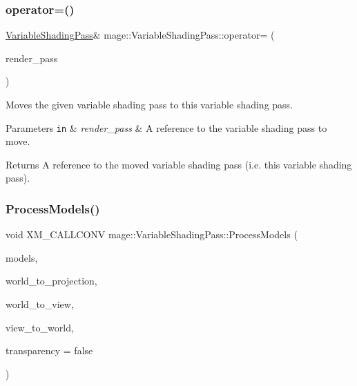 \subsubsection{\texorpdfstring{operator=()}{operator=()}\hspace{0.1cm}{\footnotesize\ttfamily [2/2]}}
{\footnotesize\ttfamily \hyperlink{classmage_1_1_variable_shading_pass}{Variable\+Shading\+Pass}\& mage\+::\+Variable\+Shading\+Pass\+::operator= (\begin{DoxyParamCaption}\item[{\hyperlink{classmage_1_1_variable_shading_pass}{Variable\+Shading\+Pass} \&\&}]{render\+\_\+pass }\end{DoxyParamCaption})\hspace{0.3cm}{\ttfamily [delete]}}

Moves the given variable shading pass to this variable shading pass.


\begin{DoxyParams}[1]{Parameters}
\mbox{\tt in}  & {\em render\+\_\+pass} & A reference to the variable shading pass to move. \\
\hline
\end{DoxyParams}
\begin{DoxyReturn}{Returns}
A reference to the moved variable shading pass (i.\+e. this variable shading pass). 
\end{DoxyReturn}
\hypertarget{classmage_1_1_variable_shading_pass_ae95dbe1db9e047a4df38bc83c41e9e2b}{}\label{classmage_1_1_variable_shading_pass_ae95dbe1db9e047a4df38bc83c41e9e2b} 
\subsubsection{\texorpdfstring{Process\+Models()}{ProcessModels()}}
{\footnotesize\ttfamily void X\+M\+\_\+\+C\+A\+L\+L\+C\+O\+NV mage\+::\+Variable\+Shading\+Pass\+::\+Process\+Models (\begin{DoxyParamCaption}\item[{const vector$<$ const \hyperlink{classmage_1_1_model_node}{Model\+Node} $\ast$ $>$ \&}]{models,  }\item[{F\+X\+M\+M\+A\+T\+R\+IX}]{world\+\_\+to\+\_\+projection,  }\item[{C\+X\+M\+M\+A\+T\+R\+IX}]{world\+\_\+to\+\_\+view,  }\item[{C\+X\+M\+M\+A\+T\+R\+IX}]{view\+\_\+to\+\_\+world,  }\item[{bool}]{transparency = {\ttfamily false} }\end{DoxyParamCaption})\hspace{0.3cm}{\ttfamily [private]}}

